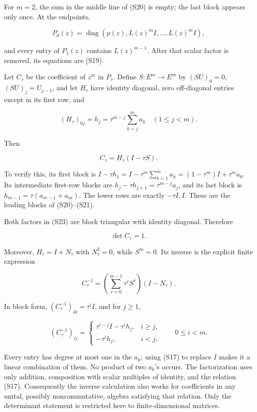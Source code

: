 \documentclass[
  11pt,
]{article}
\begin{document}
For \(m=2\), the sum in the middle line of (S20) is empty; the last
block appears only once. At the endpoints,

\[
P_0(z)=\operatorname{diag}(p(z),L(z)^mI,\ldots,L(z)^mI),    \tag{S22}
\]

and every entry of \(P_1(z)\) contains \(L(z)^{m-1}\). After that scalar
factor is removed, its equations are (S19).

Let \(C_\tau\) be the coefficient of \(z^m\) in \(P_\tau\). Define
\(S:E^m\to E^m\) by \((SU)_0=0\), \((SU)_j=U_{j-1}\), and let \(H_\tau\)
have identity diagonal, zero off-diagonal entries except in its first
row, and

\[
(H_\tau)_{0j}=h_j
=\tau^{m-j}\sum_{k=j}^m a_k\quad(1\leq j<m).
\]

Then

\[
C_\tau=H_\tau(I-\tau S).                                 \tag{S23}
\]

To verify this, its first block is
\(I-\tau h_1=I-\tau^m\sum_{k=1}^ma_k=(1-\tau^m)I+\tau^ma_0\). Its
intermediate first-row blocks are \(h_j-\tau h_{j+1}=\tau^{m-j}a_j\),
and its last block is \(h_{m-1}=\tau(a_{m-1}+a_m)\). The lower rows are
exactly \(-\tau I,I\). These are the leading blocks of (S20)--(S21).

Both factors in (S23) are block triangular with identity diagonal.
Therefore

\[
\det C_\tau=1.                                            \tag{S24}
\]

Moreover, \(H_\tau=I+N_\tau\) with \(N_\tau^2=0\), while \(S^m=0\). Its
inverse is the explicit finite expression

\[
C_\tau^{-1}
=\left(\sum_{r=0}^{m-1}\tau^rS^r\right)(I-N_\tau).          \tag{S25}
\]

In block form, \((C_\tau^{-1})_{i0}=\tau^iI\), and for \(j\geq1\),

\[
(C_\tau^{-1})_{ij}
=\begin{cases}
\tau^{i-j}I-\tau^i h_j,&i\geq j,\\
-\tau^i h_j,&i<j,
\end{cases}
\qquad 0\leq i<m.                                        \tag{S26}
\]

Every entry has degree at most one in the \(a_k\); using (S17) to
replace \(I\) makes it a linear combination of them. No product of two
\(a_k\)'s occurs. The factorization uses only addition, composition with
scalar multiples of identity, and the relation (S17). Consequently the
inverse calculation also works for coefficients in any unital, possibly
noncommutative, algebra satisfying that relation. Only the determinant
statement is restricted here to finite-dimensional matrices.
\end{document}
